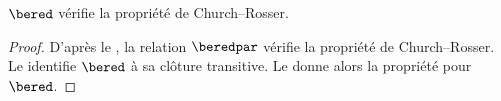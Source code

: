 \documentclass[../../../include/open-logic-section]{subfiles}
\begin{document}
\begin{thm}
$\bered$ vérifie la propriété de
Church--Rosser.
\end{thm}

\begin{proof}
D'après le , la relation $\beredpar$
vérifie la propriété de Church--Rosser. Le 
identifie $\bered$ à sa clôture transitive. Le
 donne alors la propriété pour $\bered$.
\end{proof}
\end{document}
